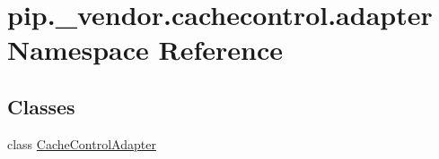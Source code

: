 \hypertarget{namespacepip_1_1__vendor_1_1cachecontrol_1_1adapter}{}\section{pip.\+\_\+vendor.\+cachecontrol.\+adapter Namespace Reference}
\label{namespacepip_1_1__vendor_1_1cachecontrol_1_1adapter}
\subsection*{Classes}
\begin{DoxyCompactItemize}
\item 
class \hyperlink{classpip_1_1__vendor_1_1cachecontrol_1_1adapter_1_1CacheControlAdapter}{Cache\+Control\+Adapter}
\end{DoxyCompactItemize}
